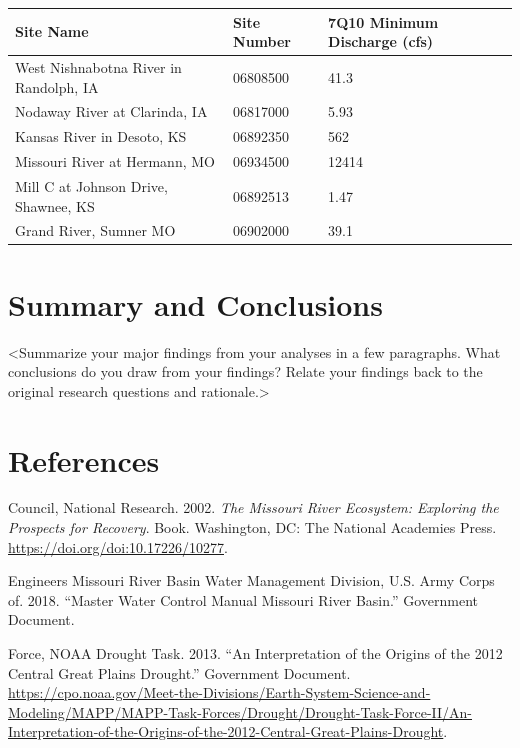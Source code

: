 \documentclass[12pt,]{article}
\begin{document}
\begin{longtable}[]{@{}lll@{}}
\toprule
Site Name & Site Number & 7Q10 Minimum Discharge (cfs)\tabularnewline
\midrule
\endhead
West Nishnabotna River in Randolph, IA & 06808500 & 41.3\tabularnewline
Nodaway River at Clarinda, IA & 06817000 & 5.93\tabularnewline
Kansas River in Desoto, KS & 06892350 & 562\tabularnewline
Missouri River at Hermann, MO & 06934500 & 12414\tabularnewline
Mill C at Johnson Drive, Shawnee, KS & 06892513 & 1.47\tabularnewline
Grand River, Sumner MO & 06902000 & 39.1\tabularnewline
\bottomrule
\end{longtable}

\newpage

\hypertarget{summary-and-conclusions}{%
\section{Summary and Conclusions}\label{summary-and-conclusions}}

\textless{}Summarize your major findings from your analyses in a few
paragraphs. What conclusions do you draw from your findings? Relate your
findings back to the original research questions and
rationale.\textgreater{}

\newpage

\hypertarget{references}{%
\section*{References}\label{references}}

\hypertarget{refs}{}
\leavevmode\hypertarget{ref-nrc2002}{}%
Council, National Research. 2002. \emph{The Missouri River Ecosystem:
Exploring the Prospects for Recovery}. Book. Washington, DC: The
National Academies Press. \url{https://doi.org/doi:10.17226/10277}.

\leavevmode\hypertarget{ref-usace2018}{}%
Engineers Missouri River Basin Water Management Division, U.S. Army
Corps of. 2018. ``Master Water Control Manual Missouri River Basin.''
Government Document.

\leavevmode\hypertarget{ref-noaa2013}{}%
Force, NOAA Drought Task. 2013. ``An Interpretation of the Origins of
the 2012 Central Great Plains Drought.'' Government Document.
\url{https://cpo.noaa.gov/Meet-the-Divisions/Earth-System-Science-and-Modeling/MAPP/MAPP-Task-Forces/Drought/Drought-Task-Force-II/An-Interpretation-of-the-Origins-of-the-2012-Central-Great-Plains-Drought}.
\end{document}

